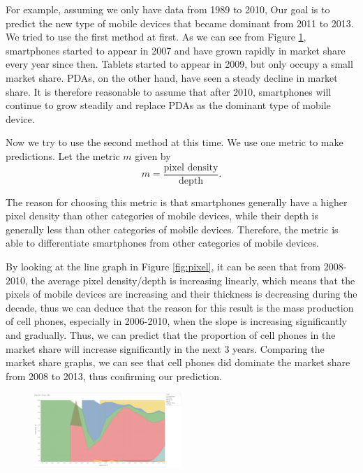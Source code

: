 \documentclass[conference]{IEEEtran}
\begin{document}
For example, assuming we only have data from 1989 to 2010, Our goal is to predict the new type of mobile devices that became dominant from 2011 to 2013. We tried to use the first method at first. As we can see from Figure \ref{fig:market-2010}, smartphones started to appear in 2007 and have grown rapidly in market share every year since then. Tablets started to appear in 2009, but only occupy a small market share. PDAs, on the other hand, have seen a steady decline in market share. It is therefore reasonable to assume that after 2010, smartphones will continue to grow steadily and replace PDAs as the dominant type of mobile device.

Now we try to use the second method at this time. We use one metric to make predictions. Let the metric $m$ given by
\[ m = \frac{\text{pixel density}}{\text{depth}}. \]

The reason for choosing this metric is that smartphones generally have a higher pixel density than other categories of mobile devices, while their depth is generally less than other categories of mobile devices. Therefore, the metric is able to differentiate smartphones from other categories of mobile devices.

By looking at the line graph in Figure \ref{fig:pixel}, it can be seen that from 2008-2010, the average pixel density/depth is increasing linearly, which means that the pixels of mobile devices are increasing and their thickness is decreasing during the decade, thus we can deduce that the reason for this result is the mass production of cell phones, especially in 2006-2010, when the slope is increasing significantly and gradually. Thus, we can predict that the proportion of cell phones in the market share will increase significantly in the next 3 years. Comparing the market share graphs, we can see that cell phones did dominate the market share from 2008 to 2013, thus confirming our prediction.

\begin{figure}
    \centering
    \includegraphics[width=0.5\textwidth]{../Visualisations/C/Market share 2010.png}
    \caption{}
    \label{fig:market-2010}
\end{figure}
\end{document}
